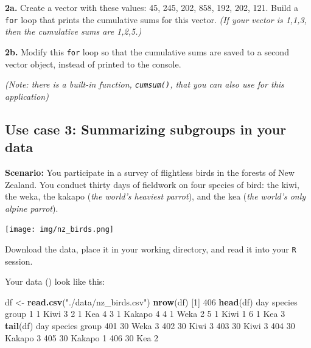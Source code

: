 \documentclass[]{book}
\newenvironment{Shaded}{\begin{snugshade}}{\end{snugshade}}
\newcommand{\DecValTok}[1]{\textcolor[rgb]{0.00,0.00,0.81}{#1}}
\newcommand{\KeywordTok}[1]{\textcolor[rgb]{0.13,0.29,0.53}{\textbf{#1}}}
\newcommand{\NormalTok}[1]{#1}
\newcommand{\StringTok}[1]{\textcolor[rgb]{0.31,0.60,0.02}{#1}}
\begin{document}
\textbf{2a.} Create a vector with these values: 45, 245, 202, 858, 192, 202, 121. Build a \texttt{for} loop that prints the cumulative sums for this vector. \emph{(If your vector is 1,1,3, then the cumulative sums are 1,2,5.)}

\textbf{2b.} Modify this \texttt{for} loop so that the cumulative sums are saved to a second vector object, instead of printed to the console.

\emph{(Note: there is a built-in function, \texttt{cumsum()}, that you can also use for this application)}

\hypertarget{use-case-3-summarizing-subgroups-in-your-data}{%
\subsection*{Use case 3: Summarizing subgroups in your data}\label{use-case-3-summarizing-subgroups-in-your-data}}

\textbf{Scenario:} You participate in a survey of flightless birds in the forests of New Zealand. You conduct thirty days of fieldwork on four species of bird: the kiwi, the weka, the kakapo (\emph{the world's heaviest parrot}), and the kea (\emph{the world's only alpine parrot}).

\texttt{[image: img/nz\_birds.png]}

Download the data, place it in your working directory, and read it into your \texttt{R} session.

Your data () look like this:

\begin{Shaded}
\begin{Highlighting}[]
\NormalTok{df <-}\StringTok{ }\KeywordTok{read.csv}\NormalTok{(}\StringTok{"./data/nz_birds.csv"}\NormalTok{)}
\KeywordTok{nrow}\NormalTok{(df)}
\NormalTok{[}\DecValTok{1}\NormalTok{] }\DecValTok{406}
\KeywordTok{head}\NormalTok{(df)}
\NormalTok{  day species group}
\DecValTok{1}   \DecValTok{1}\NormalTok{    Kiwi     }\DecValTok{3}
\DecValTok{2}   \DecValTok{1}\NormalTok{     Kea     }\DecValTok{4}
\DecValTok{3}   \DecValTok{1}\NormalTok{  Kakapo     }\DecValTok{4}
\DecValTok{4}   \DecValTok{1}\NormalTok{    Weka     }\DecValTok{2}
\DecValTok{5}   \DecValTok{1}\NormalTok{    Kiwi     }\DecValTok{1}
\DecValTok{6}   \DecValTok{1}\NormalTok{     Kea     }\DecValTok{3}
\KeywordTok{tail}\NormalTok{(df)}
\NormalTok{    day species group}
\DecValTok{401}  \DecValTok{30}\NormalTok{    Weka     }\DecValTok{3}
\DecValTok{402}  \DecValTok{30}\NormalTok{    Kiwi     }\DecValTok{3}
\DecValTok{403}  \DecValTok{30}\NormalTok{    Kiwi     }\DecValTok{3}
\DecValTok{404}  \DecValTok{30}\NormalTok{  Kakapo     }\DecValTok{3}
\DecValTok{405}  \DecValTok{30}\NormalTok{  Kakapo     }\DecValTok{1}
\DecValTok{406}  \DecValTok{30}\NormalTok{     Kea     }\DecValTok{2}
\end{Highlighting}
\end{Shaded}
\end{document}
